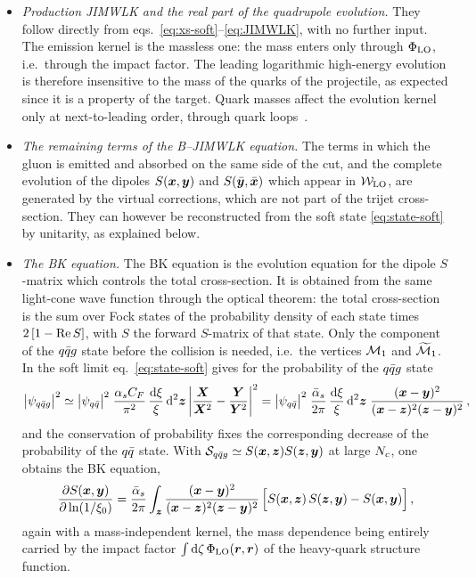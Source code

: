 \begin{itemize}
\item \emph{Production JIMWLK and the real part of the quadrupole evolution.} They follow directly from
eqs.~\eqref{eq:xs-soft}--\eqref{eq:JIMWLK}, with no further input. The emission kernel is the massless
one: the mass enters only through $\Phi_{\rm LO}$, i.e.\ through the impact factor. The leading
logarithmic high-energy evolution is therefore insensitive to the mass of the quarks of the projectile,
as expected since it is a property of the target. Quark masses affect the evolution kernel only at
next-to-leading order, through quark loops~\cite{Dai:2022imf}.
\item \emph{The remaining terms of the B--JIMWLK equation.} The terms in which the gluon is emitted and
absorbed on the same side of the cut, and the complete evolution of the dipoles $S(\bm{x},\bm{y})$ and
$S(\bar{\bm{y}},\bar{\bm{x}})$ which appear in $\mathcal{W}_{\rm LO}$, are generated by the virtual corrections, which are not part
of the trijet cross-section. They can however be reconstructed from the soft state
\eqref{eq:state-soft} by unitarity, as explained below.
\item \emph{The BK equation.} The BK equation is the evolution equation for the dipole $S$-matrix
which controls the total cross-section. It is obtained from the same light-cone wave function through
the optical theorem: the total cross-section is the sum over Fock states of the probability density of
each state times $2\,[1-{\rm Re}\, S]$, with $S$ the forward $S$-matrix of that state. Only the component of
the $q\bar q g$ state before the collision is needed, i.e.\ the vertices $\mathcal{M}_1$ and $\widetilde{\mathcal{M}}_1$. In the soft
limit eq.~\eqref{eq:state-soft} gives for the probability of the $q\bar q g$ state
\begin{equation}
\big|\psi_{q\bar q g}\big|^2\simeq\big|\psi_{q\bar q}\big|^2\;\frac{\alpha_sC_F}{\pi^2}\,\frac{{\rm d}\xi}{\xi}\,{\rm d}^2\bm{z}
\left|\frac{\bm{X}}{\bm{X}^2}-\frac{\bm{Y}}{\bm{Y}^2}\right|^2
=\big|\psi_{q\bar q}\big|^2\;\frac{\bar\alpha_s}{2\pi}\,\frac{{\rm d}\xi}{\xi}\,{\rm d}^2\bm{z}\;
\frac{(\bm{x}-\bm{y})^2}{(\bm{x}-\bm{z})^2(\bm{z}-\bm{y})^2}\,,
\end{equation}
and the conservation of probability fixes the corresponding decrease of the probability of the
$q\bar q$ state. With $\mathcal{S}_{q\bar q g}\simeq S(\bm{x},\bm{z})S(\bm{z},\bm{y})$ at large $N_c$, one obtains the BK equation,
\begin{equation}
\frac{\partial S(\bm{x},\bm{y})}{\partial\ln(1/\xi_0)}=\frac{\bar\alpha_s}{2\pi}\int_{\bm{z}}
\frac{(\bm{x}-\bm{y})^2}{(\bm{x}-\bm{z})^2(\bm{z}-\bm{y})^2}\,\Big[S(\bm{x},\bm{z})\,S(\bm{z},\bm{y})-S(\bm{x},\bm{y})\Big]\,,
\label{eq:BK}
\end{equation}
again with a mass-independent kernel, the mass dependence being entirely carried by the impact factor
$\int{\rm d}\zeta\,\Phi_{\rm LO}(\bm r,\bm r)$ of the heavy-quark structure function.
\end{itemize}

